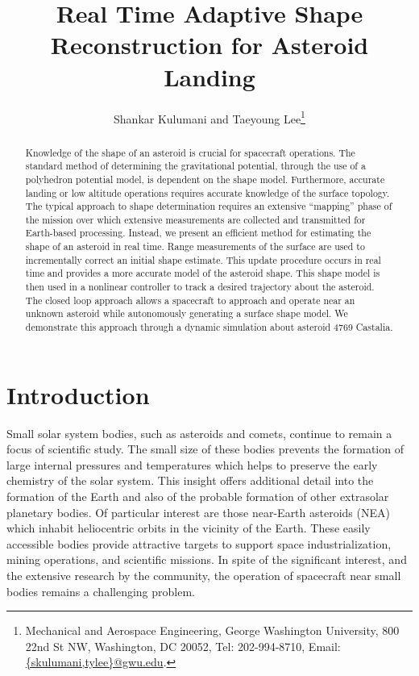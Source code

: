 \documentclass[letterpaper, paper,11pt]{AAS}		%
\begin{document}
\title{Real Time Adaptive Shape Reconstruction for Asteroid Landing}

\author{Shankar Kulumani and Taeyoung Lee\thanks{Mechanical and Aerospace Engineering, George Washington University, 800 22nd St NW, Washington, DC 20052, Tel: 202-994-8710, Email: \href{mailto:skulumani@gwu.edu}{\{skulumani,tylee\}@gwu.edu}.}
}


\maketitle{} 		

\begin{abstract}
    Knowledge of the shape of an asteroid is crucial for spacecraft operations.
    The standard method of determining the gravitational potential, through the use of a polyhedron potential model, is dependent on the shape model.
    Furthermore, accurate landing or low altitude operations requires accurate knowledge of the surface topology. 
    The typical approach to shape determination requires an extensive ``mapping'' phase of the mission over which extensive measurements are collected and transmitted for Earth-based processing.
    Instead, we present an efficient method for estimating the shape of an asteroid in real time.
    Range measurements of the surface are used to incrementally correct an initial shape estimate.
    This update procedure occurs in real time and provides a more accurate model of the asteroid shape.
    This shape model is then used in a nonlinear controller to track a desired trajectory about the asteroid.
    The closed loop approach allows a spacecraft to approach and operate near an unknown asteroid while autonomously generating a surface shape model.
    We demonstrate this approach through a dynamic simulation about asteroid 4769 Castalia.
\end{abstract}

\section{Introduction}\label{sec:introduction}
Small solar system bodies, such as asteroids and comets, continue to remain a focus of scientific study.
The small size of these bodies prevents the formation of large internal pressures and temperatures which helps to preserve the early chemistry of the solar system.
This insight offers additional detail into the formation of the Earth and also of the probable formation of other extrasolar planetary bodies.
Of particular interest are those near-Earth asteroids (NEA) which inhabit heliocentric orbits in the vicinity of the Earth. 
These easily accessible bodies provide attractive targets to support space industrialization, mining operations, and scientific missions.
In spite of the significant interest, and the extensive research by the community, the operation of spacecraft near small bodies remains a challenging problem.
\end{document}
